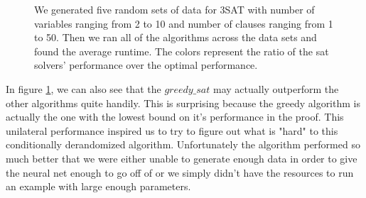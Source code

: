\documentclass[paper=a4, fontsize=11pt]{scrartcl} %
\numberwithin{equation}{section} %
\numberwithin{figure}{section} %
\numberwithin{table}{section} %
\begin{document}
\begin{figure}[ht]
\centerline{
}
\vspace{-0.1in}
\caption{We generated five random sets of data for 3SAT with number of variables ranging from 2 to 10 and number of clauses ranging from 1 to 50.  Then we ran all of the algorithms across the data sets and found the average runtime.  The colors represent the ratio of the sat solvers' performance over the optimal performance.}
\label{rt_heatmap}
\end{figure}

In figure \ref{rt_heatmap}, we can also see that the $greedy\_sat$ may actually outperform the other algorithms quite handily.  This is surprising because the greedy algorithm is actually the one with the lowest bound on it's performance in the proof.  This unilateral performance inspired us to try to figure out what is "hard" to this conditionally derandomized algorithm.  Unfortunately the algorithm performed so much better that we were either unable to generate enough data in order to give the neural net enough to go off of or we simply didn't have the resources to run an example with large enough parameters.\\
\end{document}
